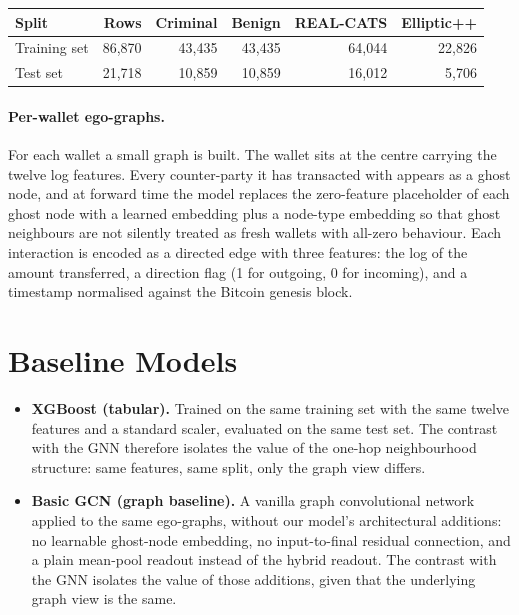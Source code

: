 \documentclass[11pt]{article}
\begin{document}
\begin{table}[h]
\centering\small
\begin{tabular}{lrrrrr}
\toprule
Split & Rows & Criminal & Benign & REAL-CATS & Elliptic++ \\
\midrule
Training set & 86{,}870 & 43{,}435 & 43{,}435 & 64{,}044 & 22{,}826 \\
Test set     & 21{,}718 & 10{,}859 & 10{,}859 & 16{,}012 &  5{,}706 \\
\bottomrule
\end{tabular}
\end{table}

\paragraph{Per-wallet ego-graphs.}
For each wallet a small graph is built. The wallet sits at the centre carrying the twelve log features. Every
counter-party it has transacted with appears as a ghost node, and at forward time the model replaces the
zero-feature placeholder of each ghost node with a learned embedding plus a node-type embedding so that ghost
neighbours are not silently treated as fresh wallets with all-zero behaviour. Each interaction is encoded as a
directed edge with three features: the log of the amount transferred, a direction flag (1 for outgoing, 0 for
incoming), and a timestamp normalised against the Bitcoin genesis block.

\section{Baseline Models}

\begin{itemize}
  \item \textbf{XGBoost (tabular).} Trained on the same training set with the same twelve features and a standard
        scaler, evaluated on the same test set. The contrast with the GNN therefore isolates the value of the
        one-hop neighbourhood structure: same features, same split, only the graph view differs.
  \item \textbf{Basic GCN (graph baseline).} A vanilla graph convolutional network applied to the same ego-graphs,
        without our model's architectural additions: no learnable ghost-node embedding, no input-to-final residual
        connection, and a plain mean-pool readout instead of the hybrid readout. The contrast with the GNN
        isolates the value of those additions, given that the underlying graph view is the same.
\end{itemize}
\end{document}
